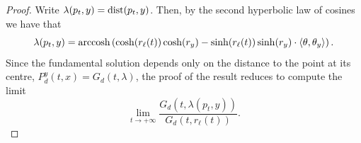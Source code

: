 \documentclass[12pt,longbibliography]{article}
\theoremstyle{definition}
\theoremstyle{remark}
\theoremstyle{example}
\begin{document}
\begin{proof}
	
	
	Write $\lambda (p_t,y) = \textup{dist} (p_t, y)$. Then, by the second hyperbolic law of cosines we have that
	\begin{equation}\label{ry1}
		\lambda (p_t,y)  = \textup{arccosh} \left( \cosh (r_\ell(t)) \cosh (r_y)-\sinh (r_\ell(t)) \sinh (r_y) \cdot \langle\theta,\theta_y\rangle \right).
	\end{equation}
	Since the fundamental solution depends only on the distance to the point at its centre, $P^y_d(t,x)=G_d(t,\lambda)$, the proof of the result reduces to compute the limit
	\begin{equation}\label{hd}
		\displaystyle\lim_{t \to +\infty} \frac{G_d (t,\lambda (p_t,y))}{G_d (t,r_\ell (t))}.
	\end{equation}
	

\end{proof}
\end{document}
